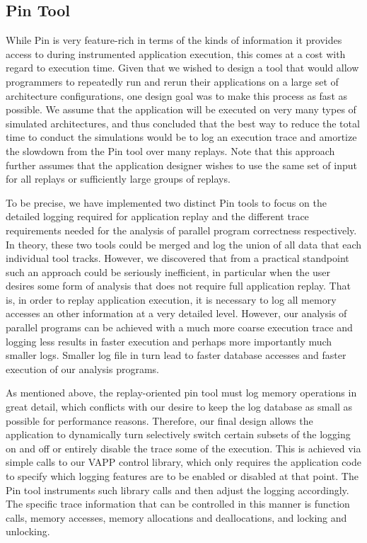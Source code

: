 \subsection{Pin Tool}
While Pin is very feature-rich in terms of the kinds of information
it provides access to during instrumented application execution, this
comes at a cost with regard to execution time.  Given that we wished to
design a tool that would allow programmers to repeatedly run and rerun
their applications on a large set of architecture configurations,
one design goal was to make this process as fast as possible.  We assume
that the application will be executed on very many types of simulated
architectures, and thus concluded that the best way to reduce the
total time to conduct the simulations would be to log an execution trace
and amortize the slowdown from the Pin tool over many replays.  Note that
this approach further assumes that the application designer wishes to
use the same set of input for all replays or sufficiently large
groups of replays.

To be precise, we have implemented two distinct Pin tools to focus
on the detailed logging required for application replay and the
different trace requirements needed for the analysis of parallel
program correctness respectively.  In theory, these two tools could
be merged and log the union of all data that each individual tool
tracks.  However, we discovered that from a practical standpoint
such an approach could be seriously inefficient, in particular
when the user desires some form of analysis that does not
require full application replay.  That is, in order to replay
application execution, it is necessary to log all memory accesses
an other information at a very detailed level.  However, our
analysis of parallel programs can be achieved with a much more
coarse execution trace and logging less results in faster execution
and perhaps more importantly much smaller logs.  Smaller log file in
turn lead to faster database accesses and faster execution of our
analysis programs.

As mentioned above, the replay-oriented pin tool must log memory
operations in great detail, which conflicts with our desire to
keep the log database as small as possible for performance reasons.
Therefore, our final design allows the application to dynamically
turn selectively switch certain subsets of the logging on and off
or entirely disable the trace some of the execution.  This is
achieved via simple calls to our VAPP control library, which 
only requires the application code to specify which logging
features are to be enabled or disabled at that point.
The Pin tool instruments such library calls and then adjust the
logging accordingly.  The specific trace information that can
be controlled in this manner is function calls, memory accesses,
memory allocations and deallocations, and locking and unlocking.

